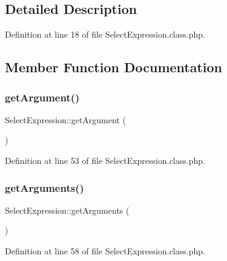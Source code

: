 \subsection{Detailed Description}


Definition at line 18 of file Select\+Expression.\+class.\+php.



\subsection{Member Function Documentation}
\hypertarget{classSelectExpression_a1311337274f53d0f3705673e86990a0b}{}\label{classSelectExpression_a1311337274f53d0f3705673e86990a0b} 
\subsubsection{\texorpdfstring{get\+Argument()}{getArgument()}}
{\footnotesize\ttfamily Select\+Expression\+::get\+Argument (\begin{DoxyParamCaption}{ }\end{DoxyParamCaption})}



Definition at line 53 of file Select\+Expression.\+class.\+php.

\hypertarget{classSelectExpression_a41d457ce5fc7cedc050c2c34a2286d9f}{}\label{classSelectExpression_a41d457ce5fc7cedc050c2c34a2286d9f} 
\subsubsection{\texorpdfstring{get\+Arguments()}{getArguments()}}
{\footnotesize\ttfamily Select\+Expression\+::get\+Arguments (\begin{DoxyParamCaption}{ }\end{DoxyParamCaption})}



Definition at line 58 of file Select\+Expression.\+class.\+php.

\hypertarget{classSelectExpression_a860e81d13389a53617fa27c377aa4e2c}{}\label{classSelectExpression_a860e81d13389a53617fa27c377aa4e2c} 
